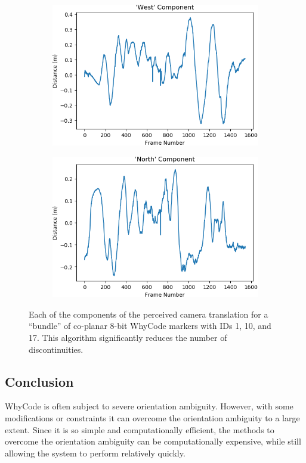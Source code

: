 \begin{figure}
    \begin{subfigure}[b]{0.49\textwidth}
         \centering
         \includegraphics[width=\textwidth]{images/bundles.csv_figure_w}
    \end{subfigure}
    \hfill
    \begin{subfigure}[b]{0.49\textwidth}
         \centering
         \includegraphics[width=\textwidth]{images/bundles.csv_figure_n}
    \end{subfigure}

    \caption{Each of the components of the perceived camera translation for a ``bundle'' of co-planar 8-bit WhyCode markers with IDs 1, 10, and 17.
    This algorithm significantly reduces the number of discontinuities.}
    \label{figure:plane_uwn}
\end{figure}

\subsection{Conclusion}

WhyCode is often subject to severe orientation ambiguity.
However, with some modifications or constraints it can overcome the orientation ambiguity to a large extent.
Since it is so simple and computationally efficient, the methods to overcome the orientation ambiguity can be computationally expensive,
while still allowing the system to perform relatively quickly.
